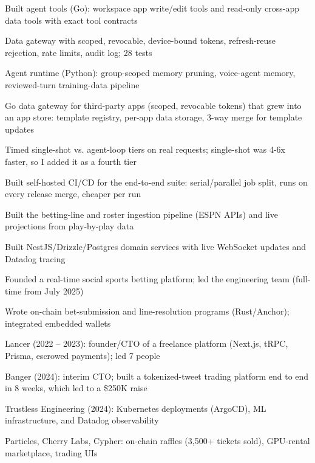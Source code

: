 \documentclass[print]{jack-resume}
\begin{document}
\begin{tightemize}
    \item Built agent tools (Go): workspace app write/edit tools and read-only cross-app data tools with exact tool contracts
    \item Data gateway with scoped, revocable, device-bound tokens, refresh-reuse rejection, rate limits, audit log; 28 tests
    \item Agent runtime (Python): group-scoped memory pruning, voice-agent memory, reviewed-turn training-data pipeline
    \item Go data gateway for third-party apps (scoped, revocable tokens) that grew into an app store: template registry, per-app data storage, 3-way merge for template updates
    \item Timed single-shot vs. agent-loop tiers on real requests; single-shot was 4-6x faster, so I added it as a fourth tier
    \item Built self-hosted CI/CD for the end-to-end suite: serial/parallel job split, runs on every release merge, cheaper per run
\end{tightemize}
\sectionsep

\begin{tightemize}
    \item Built the betting-line and roster ingestion pipeline (ESPN APIs) and live projections from play-by-play data
    \item Built NestJS/Drizzle/Postgres domain services with live WebSocket updates and Datadog tracing
    \item Founded a real-time social sports betting platform; led the engineering team (full-time from July 2025)
    \item Wrote on-chain bet-submission and line-resolution programs (Rust/Anchor); integrated embedded wallets
\end{tightemize}
\sectionsep

\begin{tightemize}
    \item Lancer (2022 – 2023): founder/CTO of a freelance platform (Next.js, tRPC, Prisma, escrowed payments); led 7 people
    \item Banger (2024): interim CTO; built a tokenized-tweet trading platform end to end in 8 weeks, which led to a \$250K raise
    \item Trustless Engineering (2024): Kubernetes deployments (ArgoCD), ML infrastructure, and Datadog observability
    \item Particles, Cherry Labs, Cypher: on-chain raffles (3,500+ tickets sold), GPU-rental marketplace, trading UIs
\end{tightemize}
\sectionsep
\end{document}

